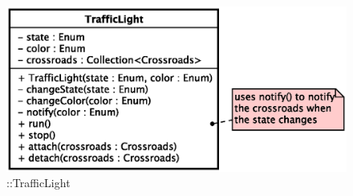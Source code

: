 \begin{figure}[h]
\centering
\includegraphics[scale=0.6,keepaspectratio]{images/solution/app/backend/traffic_light.eps}
\caption{\pActive::TrafficLight}
\label{fig:sd-app-traffic-light}
\end{figure}
\FloatBarrier
